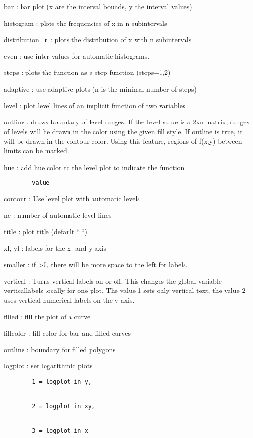 \documentclass[
]{book}
\begin{document}
bar : bar plot (x are the interval bounds, y the interval values)

histogram : plots the frequencies of x in n subintervals

distribution=n : plots the distribution of x with n subintervals

even : use inter values for automatic histograms.

steps : plots the function as a step function (steps=1,2)

adaptive : use adaptive plots (n is the minimal number of steps)

level : plot level lines of an implicit function of two variables

outline : draws boundary of level ranges. If the level value is a 2xn matrix, ranges of levels will be drawn in the color using the given fill style. If outline is true, it will be drawn in the contour color. Using this feature, regions of f(x,y) between limits can be marked.

hue : add hue color to the level plot to indicate the function

\begin{verbatim}
        value
\end{verbatim}

contour : Use level plot with automatic levels

nc : number of automatic level lines

title : plot title (default ``\,``)

xl, yl : labels for the x- and y-axis

smaller : if \textgreater0, there will be more space to the left for labels.

vertical : Turns vertical labels on or off. This changes the global variable verticallabels locally for one plot. The value 1 sets only vertical text, the value 2 uses vertical numerical labels on the y axis.

filled : fill the plot of a curve

fillcolor : fill color for bar and filled curves

outline : boundary for filled polygons

logplot : set logarithmic plots

\begin{verbatim}
        1 = logplot in y,


        2 = logplot in xy,


        3 = logplot in x
\end{verbatim}
\end{document}
